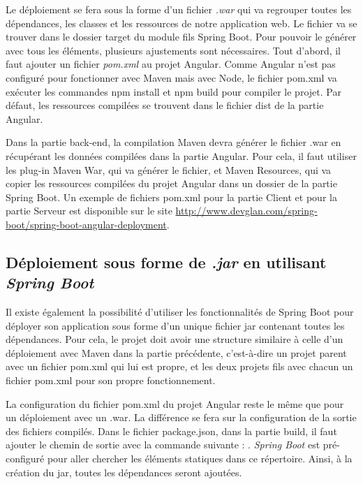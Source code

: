 \documentclass{polytech/polytech}
\begin{document}
Le déploiement se fera sous la forme d’un fichier \textit{.war} qui va regrouper toutes les dépendances, les classes et les ressources de notre application web. Le fichier va se trouver dans le dossier target du module fils Spring Boot. Pour pouvoir le générer avec tous les éléments, plusieurs ajustements sont nécessaires. Tout d’abord, il faut ajouter un fichier \textit{pom.xml} au projet Angular. Comme Angular n’est pas configuré pour fonctionner avec Maven mais avec Node, le fichier pom.xml va exécuter les commandes npm install et npm build pour compiler le projet. Par défaut, les ressources compilées se trouvent dans le fichier dist de la partie Angular. 

Dans la partie back-end, la compilation Maven devra générer le fichier .war en récupérant les données compilées dans la partie Angular. Pour cela, il faut utiliser les plug-in Maven War, qui va générer le fichier, et Maven Resources, qui va copier les ressources compilées du projet Angular dans un dossier de la partie Spring Boot. Un exemple de fichiers pom.xml pour la partie Client et pour la partie Serveur est disponible sur le site \url{http://www.devglan.com/spring-boot/spring-boot-angular-deployment}.


\subsection{Déploiement sous forme de \textit{.jar} en utilisant \textit{Spring Boot}}

Il existe également la possibilité d’utiliser les fonctionnalités de Spring Boot pour déployer son application sous forme d’un unique fichier jar contenant toutes les dépendances. Pour cela, le projet doit avoir une structure similaire à celle d’un déploiement avec Maven dans la partie précédente, c’est-à-dire un projet parent avec un fichier pom.xml qui lui est propre, et les deux projets fils avec chacun un fichier pom.xml pour son propre fonctionnement.

La configuration du fichier pom.xml du projet Angular reste le même que pour un déploiement avec un .war. La différence se fera sur la configuration de la sortie des fichiers compilés. Dans le fichier package.json, dans la partie build, il faut ajouter le chemin de sortie avec la commande suivante : . \textit{Spring Boot} est pré-configuré pour aller chercher les éléments statiques dans ce répertoire. Ainsi, à la création du jar, toutes les dépendances seront ajoutées.
\end{document}
